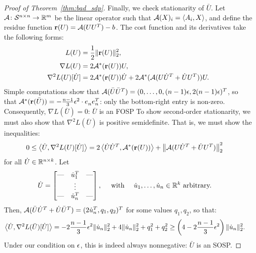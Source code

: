 \begin{proof}[Proof of Theorem~\ref{thm:bad_sdp}]
	Finally, we check stationarity of $\bar U$. Let $\mathcal{A} \colon \mathcal{S}^{n\times n} \to \mathbb{R}^m$ be the linear operator such that $\mathcal{A}(X)_i = \left\langle A_i, X \right\rangle$, and define the residue function $\mathbf{r}(U) = \mathcal{A}(UU^T) - b$. The cost function and its derivatives take the following forms:
	\begin{align*}
		L(U) & = \frac{1}{2} \|\mathbf{r}(U)\|_2^2, \\
		\nabla L(U) & = 2\mathcal{A}^*(\mathbf{r}(U))U, \\
		\nabla^2 L(U)[\dot U] & = 2\mathcal{A}^*(\mathbf{r}(U))\dot U + 2\mathcal{A}^*(\mathcal{A}(U\dot U^T + \dot U U^T))U.
	\end{align*}
	Simple computations show that $\mathcal{A}(\bar U \bar U^T) = (0, \ldots, 0, (n-1)\epsilon, 2(n-1)\epsilon)^T$, so that $\mathcal{A}^*(\mathbf{r}(\bar U)) = -\frac{n-1}{3} \epsilon^2 \cdot e_n^{} e_n^T$: only the bottom-right entry is non-zero. Consequently, $\nabla L(\bar U) = 0$: $\bar U$ is an FOSP To show second-order stationarity, we must also show that $\nabla^2 L(\bar U)$ is positive semidefinite.
	That is, we must show the inequalities:
	\begin{align*}
		0 \leq \left\langle \dot U, \nabla^2 L(U)[\dot U] \right\rangle & = 2\left\langle \dot U \dot U^T, \mathcal{A}^*(\mathbf{r}(U)) \right\rangle + \left\|\mathcal{A}(U \dot U^T + \dot U U^T)\right\|_2^2
	\end{align*}
	for all $\dot U \in \mathbb{R}^{n\times k}$. Let
	\begin{align*}
		\dot U & = \begin{bmatrix}
			\textrm{---} &\dot u_1^T & \textrm{---} \\ & \vdots&  \\ \textrm{---} &\dot u_n^T& \textrm{---}
		\end{bmatrix}, \quad \textrm{ with } \quad \dot u_1, \ldots, \dot u_n \in \mathbb{R}^{k} \textrm{ arbitrary.}
	\end{align*}
	Then, $\mathcal{A}(\bar U\dot U^T + \dot U\bar U^T) = (2\dot u_n^T, q_1, q_2)^T$ for some values $q_1, q_2$, so that:
	\begin{align*}
		\left\langle \dot U, \nabla^2 L(\bar U)[\dot U] \right\rangle & = -2\frac{n-1}{3} \epsilon^2 \|\dot u_n\|_2^2 + 4 \|\dot u_n\|_2^2 + q_1^2 + q_2^2 \geq \left(4-2\frac{n-1}{3} \epsilon^2 \right) \|\dot u_n\|_2^2.
	\end{align*}
	Under our condition on $\epsilon$, this is indeed always nonnegative: $\bar U$ is an SOSP.
\end{proof}

